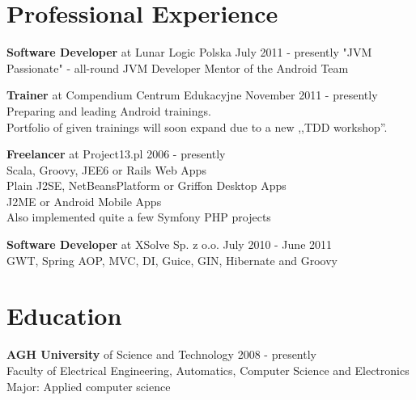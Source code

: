 \documentclass{res}
\begin{document}
 
 
 
\address{{\bf Konrad Malawski} \\
	10.01.1989, Vienna \\
	mobile: +48 602 36 66 55 \\
	}
\address{
	email: konrad.malawski@project13.pl \\
    \textbf{linkedin: linkedin.com/in/konradmalawski} \\
	\textbf{github: github.com/ktoso} \\
	blog: \url{blog.project13.pl} \\
}

\begin{resume} 

\section{Professional Experience}
{\bf Software Developer} at Lunar Logic Polska \hfill July 2011 - presently
    "JVM Passionate" - all-round JVM Developer
    Mentor of the Android Team

{\bf Trainer} at Compendium Centrum Edukacyjne \hfill November 2011 - presently
	Preparing and leading Android trainings. \\
	Portfolio of given trainings will soon expand due to a new ,,TDD workshop''.

{\bf Freelancer} at Project13.pl \hfill 2006 - presently\\
	Scala, Groovy, JEE6 or Rails Web Apps \\
	Plain J2SE, NetBeansPlatform or Griffon Desktop Apps \\
	J2ME or Android Mobile Apps \\
	Also implemented quite a few Symfony PHP projects


{\bf Software Developer} at XSolve Sp. z o.o. \hfill July 2010 - June 2011\\
	GWT, Spring {AOP, MVC, DI}, Guice, GIN, Hibernate and Groovy

\section{Education} 
{\bf AGH University} of Science and Technology \hfill 2008 - presently\\
	Faculty of Electrical Engineering, Automatics, Computer Science and Electronics\\
	Major: Applied computer science


\end{resume}
\end{document}
